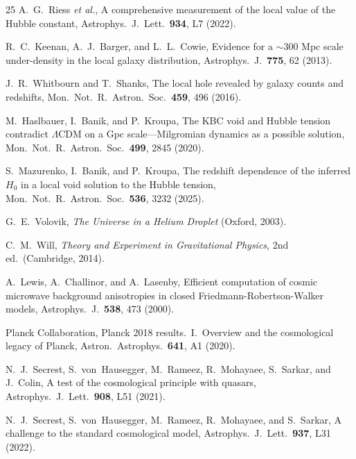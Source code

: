 \documentclass[12pt, a4paper]{article}
\begin{document}
\begin{thebibliography}{25}
A.~G.~Riess \emph{et al.},
A comprehensive measurement of the local value of the Hubble constant,
Astrophys.\ J.\ Lett.\ \textbf{934}, L7 (2022).

R.~C.~Keenan, A.~J.~Barger, and L.~L.~Cowie,
Evidence for a $\sim$300 Mpc scale under-density in the local galaxy distribution,
Astrophys.\ J.\ \textbf{775}, 62 (2013).

J.~R.~Whitbourn and T.~Shanks,
The local hole revealed by galaxy counts and redshifts,
Mon.\ Not.\ R.\ Astron.\ Soc.\ \textbf{459}, 496 (2016).

M.~Haslbauer, I.~Banik, and P.~Kroupa,
The KBC void and Hubble tension contradict $\Lambda$CDM on a Gpc scale---Milgromian dynamics as a possible solution,
Mon.\ Not.\ R.\ Astron.\ Soc.\ \textbf{499}, 2845 (2020).

S.~Mazurenko, I.~Banik, and P.~Kroupa,
The redshift dependence of the inferred $H_0$ in a local void solution to the Hubble tension,
Mon.\ Not.\ R.\ Astron.\ Soc.\ \textbf{536}, 3232 (2025).

G.~E.~Volovik,
\emph{The Universe in a Helium Droplet} (Oxford, 2003).

C.~M.~Will,
\emph{Theory and Experiment in Gravitational Physics}, 2nd ed.\ (Cambridge, 2014).

A.~Lewis, A.~Challinor, and A.~Lasenby,
Efficient computation of cosmic microwave background anisotropies in closed Friedmann-Robertson-Walker models,
Astrophys.\ J.\ \textbf{538}, 473 (2000).

Planck Collaboration,
Planck 2018 results.\ I.\ Overview and the cosmological legacy of Planck,
Astron.\ Astrophys.\ \textbf{641}, A1 (2020).

N.~J.~Secrest, S.~von~Hausegger, M.~Rameez, R.~Mohayaee, S.~Sarkar, and J.~Colin,
A test of the cosmological principle with quasars,
Astrophys.\ J.\ Lett.\ \textbf{908}, L51 (2021).

N.~J.~Secrest, S.~von~Hausegger, M.~Rameez, R.~Mohayaee, and S.~Sarkar,
A challenge to the standard cosmological model,
Astrophys.\ J.\ Lett.\ \textbf{937}, L31 (2022).

\end{thebibliography}
\end{document}
